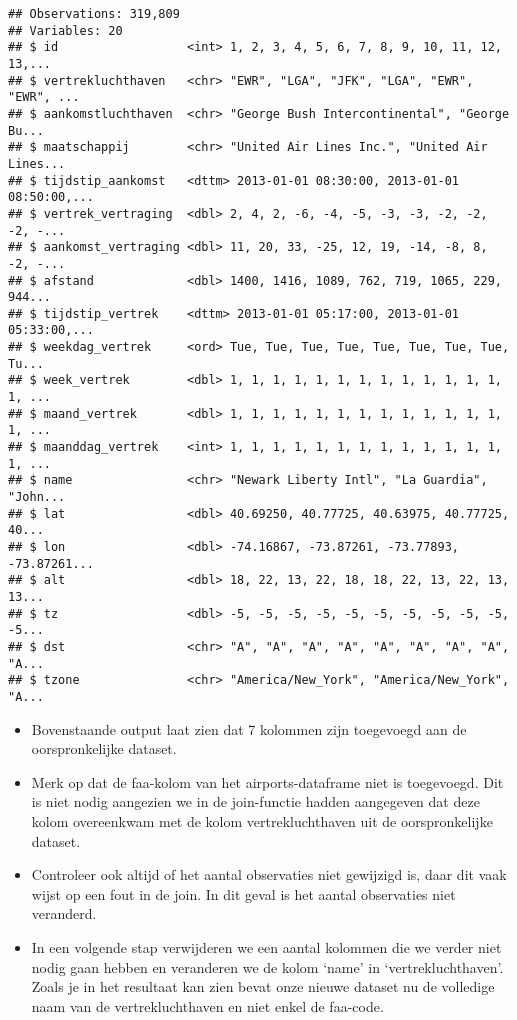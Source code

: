 \documentclass[]{memoir}
\providecommand{\tightlist}{%
  \setlength{\itemsep}{0pt}\setlength{\parskip}{0pt}}
\begin{document}
\begin{verbatim}
## Observations: 319,809
## Variables: 20
## $ id                  <int> 1, 2, 3, 4, 5, 6, 7, 8, 9, 10, 11, 12, 13,...
## $ vertrekluchthaven   <chr> "EWR", "LGA", "JFK", "LGA", "EWR", "EWR", ...
## $ aankomstluchthaven  <chr> "George Bush Intercontinental", "George Bu...
## $ maatschappij        <chr> "United Air Lines Inc.", "United Air Lines...
## $ tijdstip_aankomst   <dttm> 2013-01-01 08:30:00, 2013-01-01 08:50:00,...
## $ vertrek_vertraging  <dbl> 2, 4, 2, -6, -4, -5, -3, -3, -2, -2, -2, -...
## $ aankomst_vertraging <dbl> 11, 20, 33, -25, 12, 19, -14, -8, 8, -2, -...
## $ afstand             <dbl> 1400, 1416, 1089, 762, 719, 1065, 229, 944...
## $ tijdstip_vertrek    <dttm> 2013-01-01 05:17:00, 2013-01-01 05:33:00,...
## $ weekdag_vertrek     <ord> Tue, Tue, Tue, Tue, Tue, Tue, Tue, Tue, Tu...
## $ week_vertrek        <dbl> 1, 1, 1, 1, 1, 1, 1, 1, 1, 1, 1, 1, 1, 1, ...
## $ maand_vertrek       <dbl> 1, 1, 1, 1, 1, 1, 1, 1, 1, 1, 1, 1, 1, 1, ...
## $ maanddag_vertrek    <int> 1, 1, 1, 1, 1, 1, 1, 1, 1, 1, 1, 1, 1, 1, ...
## $ name                <chr> "Newark Liberty Intl", "La Guardia", "John...
## $ lat                 <dbl> 40.69250, 40.77725, 40.63975, 40.77725, 40...
## $ lon                 <dbl> -74.16867, -73.87261, -73.77893, -73.87261...
## $ alt                 <dbl> 18, 22, 13, 22, 18, 18, 22, 13, 22, 13, 13...
## $ tz                  <dbl> -5, -5, -5, -5, -5, -5, -5, -5, -5, -5, -5...
## $ dst                 <chr> "A", "A", "A", "A", "A", "A", "A", "A", "A...
## $ tzone               <chr> "America/New_York", "America/New_York", "A...
\end{verbatim}

\begin{itemize}
\tightlist
\item
  Bovenstaande output laat zien dat 7 kolommen zijn toegevoegd aan de oorspronkelijke dataset.
\item
  Merk op dat de faa-kolom van het airports-dataframe niet is toegevoegd. Dit is niet nodig aangezien we in de join-functie hadden aangegeven dat deze kolom overeenkwam met de kolom vertrekluchthaven uit de oorspronkelijke dataset.
\item
  Controleer ook altijd of het aantal observaties niet gewijzigd is, daar dit vaak wijst op een fout in de join. In dit geval is het aantal observaties niet veranderd.
\item
  In een volgende stap verwijderen we een aantal kolommen die we verder niet nodig gaan hebben en veranderen we de kolom `name' in `vertrekluchthaven'. Zoals je in het resultaat kan zien bevat onze nieuwe dataset nu de volledige naam van de vertrekluchthaven en niet enkel de faa-code.
\end{itemize}
\end{document}
